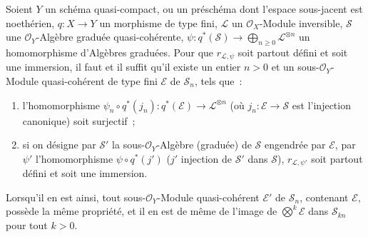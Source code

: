 \begin{proposition}[3.8.5]
\label{II.3.8.5-fr}
Soient $Y$ un schéma quasi-compact, ou un préschéma dont l'espace sous-jacent
est noethérien, $q:X\to Y$ un morphisme de type fini, $\mathcal{L}$ un
$\mathcal{O}_X$-Module inversible, $\mathcal{S}$ une $\mathcal{O}_Y$-Algèbre
graduée quasi-cohérente,
$\psi:q^*(\mathcal{S})\to\bigoplus_{n\geq0}\mathcal{L}^{\otimes n}$ un
homomorphisme d'Algèbres graduées. Pour que $r_{\mathcal{L},\psi}$ soit
partout défini et soit une immersion, il faut et il suffit qu'il existe un
entier $n>0$ et un sous-$\mathcal{O}_Y$-Module quasi-cohérent de type fini
$\mathcal{E}$ de $\mathcal{S}_n$, tels que~:
\begin{enumerate}
  \item[a)] l'homomorphisme
    $\psi_n\circ q^*(j_n):q^*(\mathcal{E})\to\mathcal{L}^{\otimes n}$
    (où $j_n:\mathcal{E}\to\mathcal{S}$ est l'injection canonique) soit
    surjectif~;
  \item[b)] si on désigne par $\mathcal{S}'$ la sous-$\mathcal{O}_Y$-Algèbre
    (graduée) de $\mathcal{S}$ engendrée par $\mathcal{E}$, par $\psi'$
    l'homomorphisme $\psi\circ q^*(j')$ ($j'$ injection de $\mathcal{S}'$
    dans $\mathcal{S}$), $r_{\mathcal{L},\psi'}$ soit partout défini et soit
    une immersion.
\end{enumerate}

Lorsqu'il en est ainsi, tout sous-$\mathcal{O}_Y$-Module quasi-cohérent
$\mathcal{E}'$ de $\mathcal{S}_n$, contenant $\mathcal{E}$, possède la même
propriété, et il en est de même de l'image de $\bigotimes^k\mathcal{E}$ dans
$\mathcal{S}_{kn}$ pour tout $k>0$.
\end{proposition}

